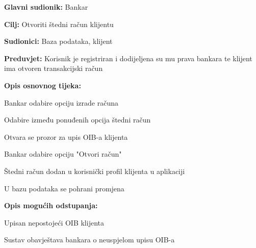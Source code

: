                
                \noindent {}
                \begin{packed_item}
                
                  \item \textbf{Glavni sudionik: }Bankar
                  \item  \textbf{Cilj:} Otvoriti štedni račun klijentu
                  \item  \textbf{Sudionici:} Baza podataka, klijent
                  \item  \textbf{Preduvjet:} Korisnik je registriran i dodijeljena su mu prava bankara te klijent ima otvoren transakcijski račun
                  \item  \textbf{Opis osnovnog tijeka:}
                  
                  \item[] \begin{packed_enum}
                
                    \item Bankar odabire opciju izrade računa
                    \item Odabire između  ponuđenih opcija štedni račun
                    \item Otvara se prozor za upis OIB-a klijenta 
                    \item Bankar odabire opciju "Otvori račun"
                    \item Štedni račun dodan u korisnički profil klijenta u aplikaciji 
                    \item U bazu podataka se pohrani promjena 
                  \end{packed_enum}
                  
                  \item  \textbf{Opis mogućih odstupanja:}
                  
                  \item[] \begin{packed_item}
                
                    \item[3.a] Upisan nepostojeći OIB klijenta 
                    \item[] \begin{packed_enum}
                      
                      \item Sustav obavještava bankara o neuspjelom upisu OIB-a
                      
                    \end{packed_enum}
                    
                  \end{packed_item}
                \end{packed_item}
                

